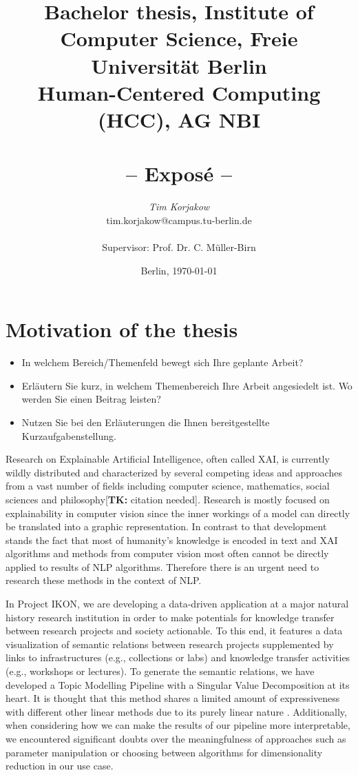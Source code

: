 \documentclass[pdftex,a4paper,12pt]{scrartcl}
\title{
{\small Bachelor thesis, Institute of Computer Science, Freie Universität Berlin}\\
{\small Human-Centered Computing (HCC), AG NBI}\\
[6ex]
{\LARGE<Titel der Arbeit>}\\
{\normalsize-- Exposé --}}
\author{
{\emph{\normalsize Tim Korjakow}}\\
{\normalsize tim.korjakow@campus.tu-berlin.de}\\\\
{\normalsize Supervisor: Prof. Dr. C. Müller-Birn}
}
\date{\normalsize Berlin, \today}
\newcommand{\tk}[1]{\textcolor{tim}{[\textbf{TK:} #1]}}
\newcommand{\blankpage}{
\newpage
\thispagestyle{empty}
\mbox{}
\newpage
}
\begin{document}
\maketitle 

\thispagestyle{empty}  %

\blankpage


\setcounter{page}{1} %

\section{Motivation of the thesis} 
\begin{itemize}
	\item In welchem Bereich/Themenfeld bewegt sich Ihre geplante Arbeit?
	\item Erläutern Sie kurz, in welchem Themenbereich Ihre Arbeit angesiedelt ist. Wo werden Sie einen Beitrag leisten?
	\item Nutzen Sie bei den Erläuterungen die Ihnen bereitgestellte Kurzaufgabenstellung.
\end{itemize}

Research on Explainable Artificial Intelligence, often called XAI, is currently wildly distributed and characterized by several competing ideas and approaches from a vast number of fields including computer science, mathematics, social sciences and philosophy\tk{citation needed}. Research is mostly focused on explainability in computer vision since the inner workings of a model can directly be translated into a graphic representation. In contrast to that development stands the fact that most of humanity's knowledge is encoded in text and XAI algorithms and methods from computer vision most often cannot be directly applied to results of NLP algorithms. Therefore there is an urgent need to research these methods in the context of NLP.

In Project IKON, we are developing a data-driven application at a major natural history research institution in order to make potentials for knowledge transfer between research projects and society actionable. To this end, it features a data visualization of semantic relations between research projects supplemented by links to infrastructures (e.g., collections or labs) and knowledge transfer activities (e.g., workshops or lectures). To generate the semantic relations, we have developed a Topic Modelling Pipeline with a Singular Value Decomposition at its heart. It is thought that this method shares a limited amount of expressiveness with different other linear methods due to its purely linear nature \cite{arrasWhatRelevantText2017}. Additionally, when considering how we can make the results of our pipeline more interpretable, we encountered significant doubts over the meaningfulness of approaches such as parameter manipulation or choosing between algorithms for dimensionality reduction \cite{benjaminTransparencyMediationMeaning2018} in our use case.
\end{document}
